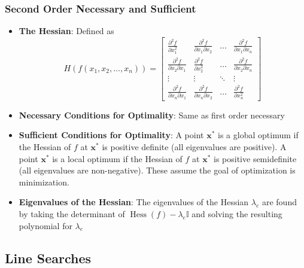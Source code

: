 \documentclass[12pt]{article}
\newcommand{\Item}[1]{\item \textbf{#1}:}
\newcommand{\boldx}{\mathbf{x}}
\newcommand{\xstar}{\boldx^*}
\newcommand{\PPartial}[2]{\frac{\partial^2 #1}{\partial #2^2}}
\newcommand{\PPPartial}[3]{\frac{\partial^2 #1}{\partial #2 \partial #3}}
\DeclareMathOperator{\Hessian}{Hess}
\begin{document}
\subsubsection{Second Order Necessary and Sufficient}
\begin{itemize}
\Item{The Hessian} Defined as
\[H\left(f(x_1,x_2,\dots,x_n)\right) =  \begin{bmatrix}
\PPartial{f}{x_1} & \PPPartial{f}{x_1}{x_2} & \dots & \PPPartial{f}{x_1}{x_n}\\
\PPPartial{f}{x_2}{x_1} & \PPartial{f}{x_2} & \dots & \PPPartial{f}{x_2}{x_n}\\
\vdots & \vdots & \ddots & \vdots\\
\PPPartial{f}{x_n}{x_1} & \PPPartial{f}{x_n}{x_2} & \dots & \PPartial{f}{x_n}
\end{bmatrix}\]
\Item{Necessary Conditions for Optimality} Same as first order necessary
\Item{Sufficient Conditions for Optimality} A point $\xstar$ is a global optimum if the Hessian of $f$ at $\xstar$ is positive definite (all eigenvalues are positive). A point $\xstar$ is a local optimum if the Hessian of $f$ at $\xstar$ is positive semidefinite (all eigenvalues are non-negative). These assume the goal of optimization is minimization.
\Item{Eigenvalues of the Hessian} The eigenvalues of the Hessian $\lambda_e$ are found by taking the determinant of $\Hessian(f)-\lambda_e\mathbb{I}$ and solving the resulting polynomial for $\lambda_e$

\end{itemize}

\subsection{Line Searches}
\end{document}

